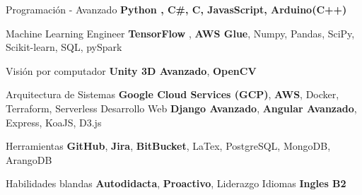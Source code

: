 

\begin{cvskills}

  \cvskill
    {Programación - Avanzado} %
    {\textbf{Python , C\#, C, JavasScript, Arduino(C++)}} %

  \cvskill
    {Machine Learning Engineer}
    {\textbf{TensorFlow} , \textbf{AWS Glue}, Numpy, Pandas, SciPy, Scikit-learn, SQL, pySpark}

  \cvskill
    {Visión por computador} %
    {\textbf{Unity 3D Avanzado}, \textbf{OpenCV}} %

\cvskill
    {Arquitectura de Sistemas}
    {\textbf{Google Cloud Services (GCP)}, \textbf{AWS}, Docker, Terraform, Serverless}
  \cvskill
    {Desarrollo Web} %
    {\textbf{Django Avanzado}, \textbf{Angular Avanzado}, Express, KoaJS, D3.js} %

  \cvskill
    {Herramientas}
    {\textbf{GitHub}, \textbf{Jira}, \textbf{BitBucket}, LaTex, PostgreSQL, MongoDB, ArangoDB}

  \cvskill
    {Habilidades blandas}
    {\textbf{Autodidacta}, \textbf{Proactivo}, Liderazgo}
  \cvskill
    {Idiomas} %
    {\textbf{Ingles B2}} %

\end{cvskills}
